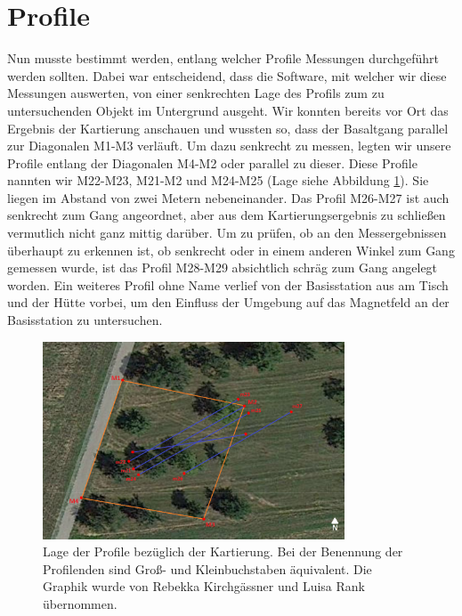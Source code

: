 \section{Profile}

Nun musste bestimmt werden, entlang welcher Profile Messungen durchgeführt werden sollten. Dabei war entscheidend, dass die Software, mit welcher wir diese Messungen auswerten, von einer senkrechten Lage des Profils zum zu untersuchenden Objekt im Untergrund ausgeht.  Wir konnten bereits vor Ort das Ergebnis der Kartierung anschauen und wussten so, dass der Basaltgang parallel zur Diagonalen M1-M3 verläuft. Um dazu senkrecht zu messen, legten wir unsere Profile entlang der Diagonalen M4-M2 oder parallel zu dieser. Diese Profile nannten wir M22-M23, M21-M2 und M24-M25 (Lage siehe Abbildung \ref{fig:Profilegps}). Sie liegen im Abstand von zwei Metern nebeneinander. Das Profil M26-M27 ist auch senkrecht zum Gang angeordnet, aber aus dem Kartierungsergebnis zu schließen vermutlich nicht ganz mittig darüber. Um zu prüfen, ob an den Messergebnissen überhaupt zu erkennen ist, ob senkrecht oder in einem anderen Winkel zum Gang gemessen wurde, ist das Profil M28-M29 absichtlich schräg zum Gang angelegt worden. Ein weiteres Profil ohne Name verlief von der Basisstation aus am Tisch und der Hütte vorbei, um den Einfluss der Umgebung auf das Magnetfeld an der Basisstation zu untersuchen.

\begin{figure}[!ht]
 \centering
 \includegraphics[width=0.8\textwidth]{fig/Profilegps}
 \caption[Lage der Profile bezüglich der Kartierung]{Lage der Profile bezüglich der Kartierung. Bei der Benennung der Profilenden sind Groß- und Kleinbuchstaben äquivalent. Die Graphik wurde von Rebekka Kirchgässner und Luisa Rank übernommen.}
 \label{fig:Profilegps}
\end{figure}

